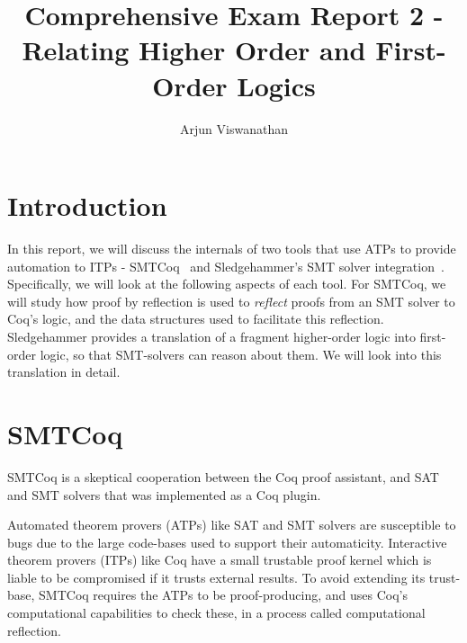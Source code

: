 \documentclass{article}
\begin{document}
\title{Comprehensive Exam Report 2 - Relating Higher Order and First-Order Logics}
\author{Arjun Viswanathan}
\date{}
\maketitle

\section{Introduction}
\label{sec:intro}
	In this report, we will discuss the 
	internals of two tools that use ATPs to 
	provide automation to ITPs - 
	SMTCoq~\cite{DBLP:phd/hal/Keller13} and 
	Sledgehammer's SMT solver 
	integration~\cite{bohme}. Specifically, 
	we will look at the following aspects 
	of each tool. For SMTCoq, we will study 
	how proof by reflection is used to 
	\textit{reflect} proofs from an SMT solver
	to Coq's logic, and the data structures 
	used to facilitate this reflection.
	Sledgehammer provides a translation of 
	a fragment higher-order logic into 
	first-order logic, so that 
	SMT-solvers can reason about them. We 
	will look into this translation in 
	detail.

\section{SMTCoq}
\label{sec:smtcoq}
	SMTCoq is a skeptical cooperation between 
	the Coq proof assistant, and SAT and SMT 
	solvers that was implemented as a Coq 
	plugin.
	
	Automated theorem provers (ATPs) like SAT 
	and SMT solvers are susceptible to bugs 
	due to the large code-bases used to 
	support	their automaticity. Interactive 
	theorem provers (ITPs) like Coq have a 
	small trustable proof kernel which is 
	liable to be compromised if it trusts 
	external results. To avoid extending 
	its trust-base, SMTCoq requires the 
	ATPs to be proof-producing, and uses 
	Coq's computational capabilities to 
	check these, in a process called 
	computational reflection. 
	
\end{document}
